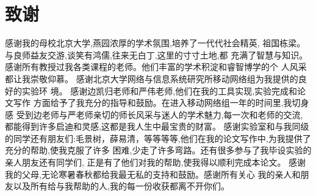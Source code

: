 
\chapter{致谢}
感谢我的母校北京大学,燕园浓厚的学术氛围,培养了一代代社会精英,
祖国栋梁。与良师益友交游,谈笑有鸿儒,往来无白丁,这里的寸寸土地,都
充满了智慧与知识。
  感谢所有教授过我各类课程的老师。他们丰富的学术积淀和睿智博学的个
人风采都让我崇敬仰慕。
  感谢北京大学网络与信息系统研究所移动网络组为我提供的良好的实验环
境。
感谢边凯归老师和严伟老师,他们在我的工具实现,实验完成和论文写作 方面给予了我充分的指导和鼓励。在进入移动网络组一年的时间里,我切身感 受到边老师与严老师亲切的师长风采与迷人的学术魅力,每一次和老师的交流, 都能得到许多启迪和灵感,这都是我人生中最宝贵的财富。
  感谢实验室和与我同级的同学还有朋友们:毛景树，薛易清，等等等等,他们在我的论文写作中,为我提供了充分的帮助,使我克服了许多
困难,少走了许多弯路。还有很多参与了我毕设实验的亲人朋友还有同学们,
正是有了他们对我的帮助,使我得以顺利完成本论文。
  感谢我的父母,无论寒暑春秋都给我最无私的支持和鼓励。感谢所有关心
我的亲人和朋友以及所有给与我帮助的人,我的每一份收获都离不开你们。

